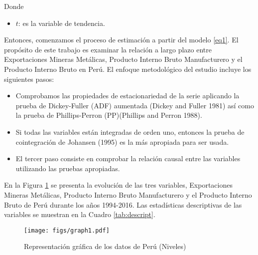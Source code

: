 \documentclass[11pt,]{article}
\providecommand{\tightlist}{%
\setlength{\itemsep}{0pt}\setlength{\parskip}{0pt}}
\begin{document}
Donde

\begin{itemize}
\tightlist
\item
  \(t\): es la variable de tendencia.
\end{itemize}

Entonces, comenzamos el proceso de estimación a partir del modelo
\ref{eq1}. El propósito de este trabajo es examinar la relación a largo
plazo entre Exportaciones Mineras Metálicas, Producto Interno Bruto
Manufacturero y el Producto Interno Bruto en Perú. El enfoque
metodológico del estudio incluye los siguientes pasos:

\begin{itemize}
\tightlist
\item
  Comprobamos las propiedades de estacionariedad de la serie aplicando
  la prueba de Dickey-Fuller (ADF) aumentada (Dickey and Fuller 1981)
  así como la prueba de Phillips-Perron (PP)(Phillips and Perron 1988).
\item
  Si todas las variables están integradas de orden uno, entonces la
  prueba de cointegración de Johansen (1995) es la más apropiada para
  ser usada.
\item
  El tercer paso consiste en comprobar la relación causal entre las
  variables utilizando las pruebas apropiadas.
\end{itemize}

En la Figura \ref{fig:plot1} se presenta la evolución de las tres
variables, Exportaciones Mineras Metálicas, Producto Interno Bruto
Manufacturero y el Producto Interno Bruto de Perú durante los años
1994-2016. Las estadísticas descriptivas de las variables se muestran en
la Cuadro \ref{tab:descript}.

\begin{figure}
\centering
\texttt{[image: figs/graph1.pdf]}
\caption{\label{fig:plot1} Representación gráfica de los datos de Perú
(Niveles)}
\end{figure}
\end{document}
